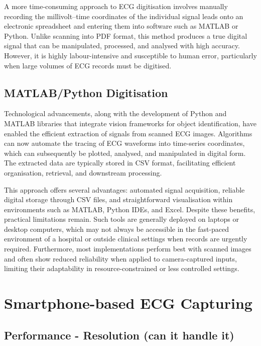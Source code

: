 A more time-consuming approach to ECG digitisation involves manually recording the millivolt–time coordinates of the individual signal leads onto an electronic spreadsheet and entering them into software such as MATLAB or Python. Unlike scanning into PDF format, this method produces a true digital signal that can be manipulated, processed, and analysed with high accuracy. However, it is highly labour-intensive and susceptible to human error, particularly when large volumes of ECG records must be digitised.

\subsection{MATLAB/Python Digitisation}

Technological advancements, along with the development of Python and MATLAB libraries that integrate vision frameworks for object identification, have enabled the efficient extraction of signals from scanned ECG images. Algorithms can now automate the tracing of ECG waveforms into time-series coordinates, which can subsequently be plotted, analysed, and manipulated in digital form. The extracted data are typically stored in CSV format, facilitating efficient organisation, retrieval, and downstream processing.

This approach offers several advantages: automated signal acquisition, reliable digital storage through CSV files, and straightforward visualisation within environments such as MATLAB, Python IDEs, and Excel. Despite these benefits, practical limitations remain. Such tools are generally deployed on laptops or desktop computers, which may not always be accessible in the fast-paced environment of a hospital or outside clinical settings when records are urgently required. Furthermore, most implementations perform best with scanned images and often show reduced reliability when applied to camera-captured inputs, limiting their adaptability in resource-constrained or less controlled settings.


\section{Smartphone-based ECG Capturing}

\subsection{Performance - Resolution (can it handle it)}
